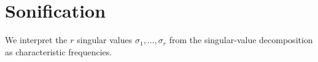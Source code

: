 \documentclass[11pt]{article}
\begin{document}
%
%    

\section*{Sonification}
We interpret the $r$ singular values $\sigma_1, \ldots, \sigma_r$ from the singular-value decomposition as characteristic frequencies. 
\end{document}
